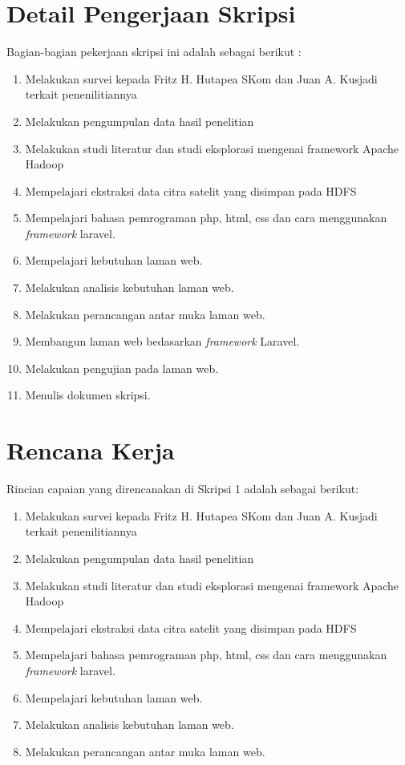 \documentclass[a4paper,twoside]{article}
\begin{document}
\section{Detail Pengerjaan Skripsi}
Bagian-bagian pekerjaan skripsi ini adalah sebagai berikut :
	\begin{enumerate}
		\item Melakukan survei kepada Fritz H. Hutapea SKom dan Juan A. Kusjadi terkait penenilitiannya
		\item Melakukan pengumpulan data hasil penelitian
		\item Melakukan studi literatur dan studi eksplorasi mengenai framework Apache Hadoop
		\item Mempelajari ekstraksi data citra satelit yang disimpan pada HDFS
		\item Mempelajari bahasa pemrograman php, html, css dan cara menggunakan \emph{framework} laravel.
		\item Mempelajari kebutuhan laman web.
		\item Melakukan analisis kebutuhan laman web.
		\item Melakukan perancangan antar muka laman web.
		\item Membangun laman web bedasarkan \emph{framework} Laravel.
		\item Melakukan pengujian pada laman web.
		\item Menulis dokumen skripsi.
	\end{enumerate}

\section{Rencana Kerja}
Rincian capaian yang direncanakan di Skripsi 1 adalah sebagai berikut:
\begin{enumerate}
\item Melakukan survei kepada Fritz H. Hutapea SKom dan Juan A. Kusjadi terkait penenilitiannya
\item Melakukan pengumpulan data hasil penelitian
\item Melakukan studi literatur dan studi eksplorasi mengenai framework Apache Hadoop
\item Mempelajari ekstraksi data citra satelit yang disimpan pada HDFS
\item Mempelajari bahasa pemrograman php, html, css dan cara menggunakan \emph{framework} laravel.
\item Mempelajari kebutuhan laman web.
\item Melakukan analisis kebutuhan laman web.
\item Melakukan perancangan antar muka laman web.
\end{enumerate}
\end{document}

